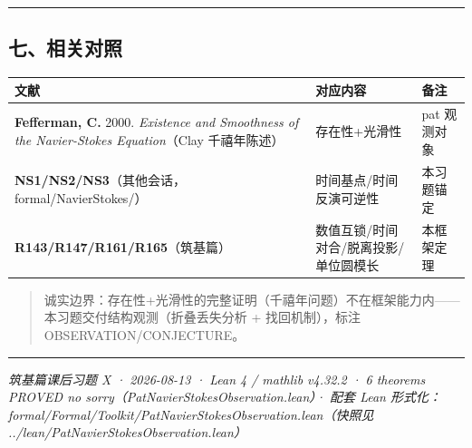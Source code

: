 \documentclass[
]{article}
\newcounter{none} %
\begin{document}
\begin{center}\rule{0.5\linewidth}{0.5pt}\end{center}

\subsection{七、相关对照}\label{ux4e03ux76f8ux5173ux5bf9ux7167}

{\def\LTcaptype{none} %
\begin{longtable}[]{@{}
  >{\raggedright\arraybackslash}p{}
  >{\raggedright\arraybackslash}p{}
  >{\raggedright\arraybackslash}p{}@{}}
\toprule\noalign{}
\begin{minipage}[b]{\linewidth}\raggedright
文献
\end{minipage} & \begin{minipage}[b]{\linewidth}\raggedright
对应内容
\end{minipage} & \begin{minipage}[b]{\linewidth}\raggedright
备注
\end{minipage} \\
\midrule\noalign{}
\endhead
\bottomrule\noalign{}
\endlastfoot
\textbf{Fefferman, C.} 2000. \emph{Existence and Smoothness of the
Navier-Stokes Equation}（Clay 千禧年陈述） & 存在性+光滑性 & pat
观测对象 \\
\textbf{NS1/NS2/NS3}（其他会话，formal/NavierStokes/） &
时间基点/时间反演可逆性 & 本习题锚定 \\
\textbf{R143/R147/R161/R165}（筑基篇） &
数值互锁/时间对合/脱离投影/单位圆模长 & 本框架定理 \\
\end{longtable}
}

\begin{quote}
诚实边界：存在性+光滑性的完整证明（千禧年问题）不在框架能力内------本习题交付结构观测（折叠丢失分析
+ 找回机制），标注 OBSERVATION/CONJECTURE。
\end{quote}

\begin{center}\rule{0.5\linewidth}{0.5pt}\end{center}

\emph{筑基篇课后习题 X · 2026-08-13 · Lean 4 / mathlib v4.32.2 · 6
theorems PROVED no sorry（PatNavierStokesObservation.lean）· 配套 Lean
形式化：formal/Formal/Toolkit/PatNavierStokesObservation.lean（快照见
../lean/PatNavierStokesObservation.lean）}
\end{document}
